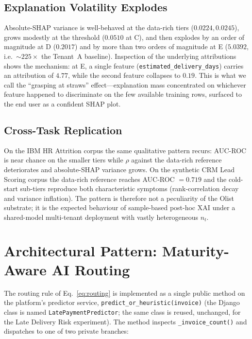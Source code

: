 \documentclass[conference]{IEEEtran}
\newcommand{\auc}{AUC\nobreakdash-ROC}
\newcommand{\nT}{n_t}
\begin{document}
\subsection{Explanation Volatility Explodes}
Absolute-SHAP variance is well-behaved at the data-rich tiers
($0.0224, 0.0245$), grows modestly at the threshold ($0.0510$ at C), and
then explodes by an order of magnitude at D ($0.2017$) and by more than
two orders of magnitude at E ($5.0392$, i.e.\ ${\sim}225\times$ the
Tenant~A baseline). Inspection of the underlying attributions shows the
mechanism: at E, a single feature
(\texttt{estimated\_delivery\_days}) carries an attribution of $4.77$,
while the second feature collapses to $0.19$. This is what we call the
``grasping at straws'' effect---explanation mass concentrated on
whichever feature happened to discriminate on the few available
training rows, surfaced to the end user as a confident SHAP plot.

\subsection{Cross-Task Replication}
\label{sec:cross-task}
On the IBM HR Attrition corpus the same qualitative pattern recurs:
\auc{} is near chance on the smaller tiers while $\rho$ against the
data-rich reference deteriorates and absolute-SHAP variance grows. On
the synthetic CRM Lead Scoring corpus the data-rich reference reaches
\auc{} $= 0.719$ and the cold-start sub-tiers reproduce both
characteristic symptoms (rank-correlation decay and variance inflation).
The pattern is therefore not a peculiarity of the Olist substrate; it
is the expected behaviour of sample-based post-hoc XAI under a
shared-model multi-tenant deployment with vastly heterogeneous $\nT$.

\section{Architectural Pattern: Maturity-Aware AI Routing}
\label{sec:arch}

The routing rule of Eq.~\ref{eq:routing} is implemented as a single
public method on the platform's predictor service,
\texttt{predict\_or\_heuristic(invoice)} (the Django class is named
\texttt{LatePaymentPredictor}; the same class is reused, unchanged, for
the Late Delivery Risk experiment). The method
inspects \texttt{\_invoice\_count()} and dispatches to one of two
private branches:
\end{document}
